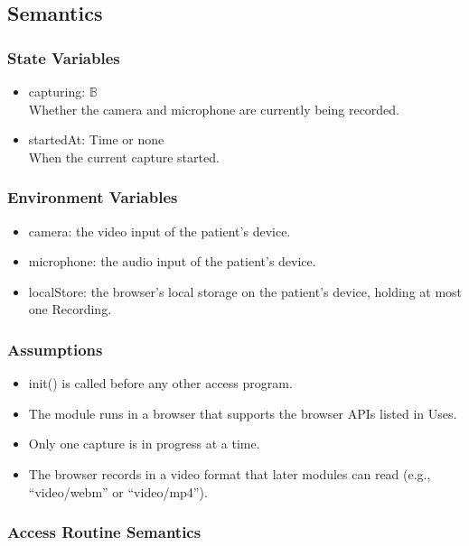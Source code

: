 \documentclass[12pt, titlepage]{article}
\begin{document}
\subsection{Semantics}

\subsubsection{State Variables}
\begin{itemize}
\item capturing: $\mathbb{B}$\\
Whether the camera and microphone are currently being recorded.
\item startedAt: Time or none\\
When the current capture started.
\end{itemize}

\subsubsection{Environment Variables}
\begin{itemize}
\item camera: the video input of the patient's device.
\item microphone: the audio input of the patient's device.
\item localStore: the browser's local storage on the patient's device, holding
  at most one Recording.
\end{itemize}

\subsubsection{Assumptions}
\begin{itemize}
\item init() is called before any other access program.
\item The module runs in a browser that supports the browser APIs listed in Uses.
\item Only one capture is in progress at a time.
\item The browser records in a video format that later modules can read
  (e.g., ``video/webm'' or ``video/mp4'').
\end{itemize}

\subsubsection{Access Routine Semantics}
\end{document}
